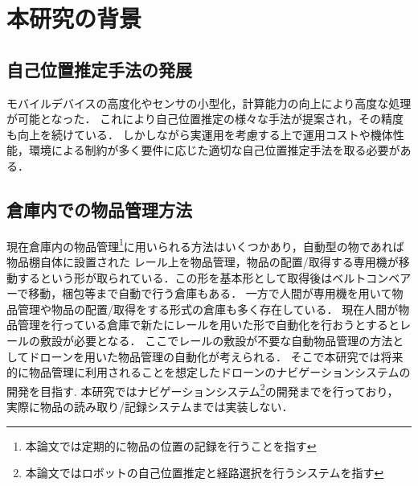 \section{本研究の背景}
\subsection{自己位置推定手法の発展}
モバイルデバイスの高度化やセンサの小型化，計算能力の向上により高度な処理が可能となった．
これにより自己位置推定の様々な手法が提案され，その精度も向上を続けている．
しかしながら実運用を考慮する上で運用コストや機体性能，環境による制約が多く要件に応じた適切な自己位置推定手法を取る必要がある．

\subsection{倉庫内での物品管理方法}
現在倉庫内の物品管理\footnote{本論文では定期的に物品の位置の記録を行うことを指す}に用いられる方法はいくつかあり，自動型の物であれば物品棚自体に設置された
レール上を物品管理，物品の配置/取得する専用機が移動するという形が取られている．この形を基本形として取得後はベルトコンベアーで移動，梱包等まで自動で行う倉庫もある．
一方で人間が専用機を用いて物品管理や物品の配置/取得をする形式の倉庫も多く存在している．
現在人間が物品管理を行っている倉庫で新たにレールを用いた形で自動化を行おうとするとレールの敷設が必要となる．
ここでレールの敷設が不要な自動物品管理の方法としてドローンを用いた物品管理の自動化が考えられる．
そこで本研究では将来的に物品管理に利用されることを想定したドローンのナビゲーションシステムの開発を目指す.
本研究ではナビゲーションシステム\footnote{本論文ではロボットの自己位置推定と経路選択を行うシステムを指す}の開発までを行っており，
実際に物品の読み取り/記録システムまでは実装しない．

